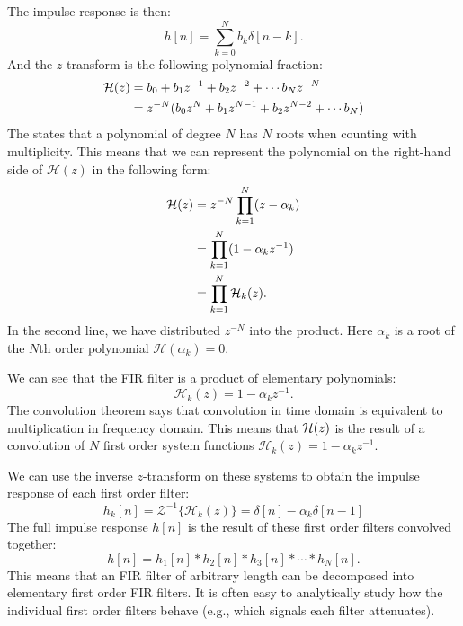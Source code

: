 The impulse response is then:
\begin{equation}
  h[n] = \sum_{k=0}^{N} b_k \delta[n-k].
\end{equation}
And the $z$-transform is the following polynomial fraction:
\begin{align}
  \mathcal{H}(z) & =  b_0 + b_1 z^{-1} + b_2 z^{-2} + \cdots b_N z^{-N}          \\
       & =  z^{-N} (b_0z^{N} + b_1 z^{N-1} + b_2 z^{N-2} + \cdots b_N)
\end{align}
The \emph{} states that a polynomial of degree $N$ has $N$
roots when counting with multiplicity. This means that we can represent the polynomial on the right-hand side of
$\mathcal{H}(z)$ in the following form:
\begin{align}
  \mathcal{H}(z) & = z^{-N} \prod_{k=1}^{N} (z-\alpha_k)  \\
       & =  \prod_{k=1}^{N} (1-\alpha_k z^{-1}) \\
       & = \prod_{k=1}^{N}\mathcal{H}_k(z).
\end{align}
In the second line, we have distributed $z^{-N}$ into the
product. Here $\alpha_k$ is a root of the $N$th order polynomial
$\mathcal{H}(\alpha_k)=0$.

We can see that the FIR filter is a product of elementary polynomials:
\begin{equation}
  \mathcal{H}_k(z) = 1-\alpha_k z^{-1}.
\end{equation}
The convolution theorem says that convolution in time domain is
equivalent to multiplication in frequency domain. This means that
$\mathcal{H}(z)$ is the result of a convolution of $N$ first order system
functions $\mathcal{H}_k(z)=1-\alpha_k z^{-1}$.

We can use the inverse $z$-transform on these systems to obtain the impulse
response of each first order filter:
\begin{equation}
  h_k[n] = \mathcal{Z}^{-1}\{\mathcal{H}_k(z)\} = \delta[n]-\alpha_k \delta[n-1]
\end{equation}
The full impulse response $h[n]$ is the result of these first order filters convolved together:
\begin{equation}
  h[n] = h_1[n]*h_2[n]*h_3[n]*\cdots*h_{N}[n].
\end{equation}
This means that an FIR filter of arbitrary length can be decomposed
into elementary first order FIR filters. It is often easy to
analytically study how the individual first order filters behave (e.g.,
which signals each filter attenuates).


